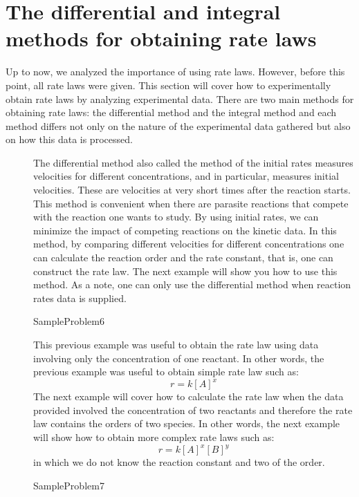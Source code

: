 \documentclass[main.tex]{subfiles}
\newcommand\chapterlabel{Ch-kinetics}
\begin{document}
\section{The differential and integral methods for obtaining rate laws}
Up to now, we analyzed the importance of using rate laws. However, before this point, all rate laws were given. This section will cover how to experimentally obtain rate laws by analyzing experimental data. There are two main methods for obtaining rate laws: the differential method and the integral method and each method differs not only on the nature of the experimental data gathered but also on how this data is processed. 
\sloppy 
\begin{description}
\item[] 
The differential method also called the method of the initial rates measures velocities for different concentrations, and in particular, measures initial velocities. These are velocities at very short times after the reaction starts. This method is convenient when there are parasite reactions that compete with the reaction one wants to study. By using initial rates, we can minimize the impact of competing reactions on the kinetic data.
In this method, by comparing different velocities for different concentrations one can calculate the reaction order and the rate constant, that is, one can construct the rate law. The next example will show you how to use this method. As a note, one can only use the differential method when reaction rates data is supplied.

  {SampleProblem6}



This previous example was useful to obtain the rate law using data involving only the concentration of one reactant. In other words, the previous example was useful to obtain simple rate law such as:
\[r=k[A]^x\]
The next example will cover how to calculate the rate law when the data provided involved the concentration of two reactants and therefore the rate law contains the orders of two species. In other words, the next example will show how to obtain more complex rate laws such as:
\[r=k[A]^x[B]^y\]
in which we do not know the reaction constant and two of the order.


  {SampleProblem7}




\end{description}
\end{document}

